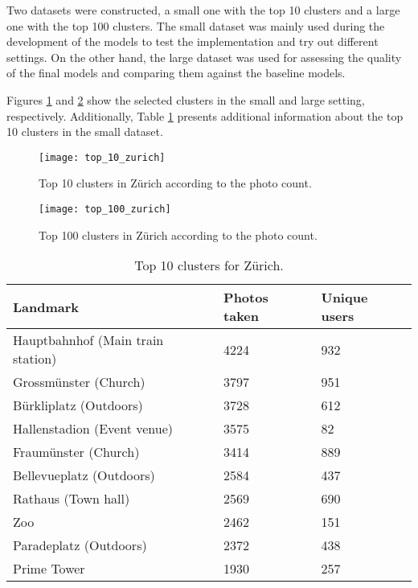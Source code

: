 Two datasets were constructed, a small one with the top 10 clusters and a large one with the top 100 clusters. The small dataset was mainly used during the development of the models to test the implementation and try out different settings. On the other hand, the large dataset was used for assessing the quality of the final models and comparing them against the baseline models.

Figures \ref{fig:top_10_zurich} and \ref{fig:top_100_zurich} show the selected clusters in the small and large setting, respectively. Additionally, Table \ref{tab:top_10_clusters} presents additional information about the top 10 clusters in the small dataset.

\begin{figure}
  \centering
  \texttt{[image: top\_10\_zurich]}
  \caption{Top 10 clusters in Zürich according to the photo count.}
  \label{fig:top_10_zurich}
\end{figure}

\begin{figure}
  \centering
  \texttt{[image: top\_100\_zurich]}
  \caption{Top 100 clusters in Zürich according to the photo count.}
  \label{fig:top_100_zurich}
\end{figure}


\begin{table}
  \centering
  \caption{Top 10 clusters for Zürich.}
  \begin{tabular}{@{}lll@{}}
    \toprule
    Landmark & Photos taken & Unique users  \\
    \midrule
    Hauptbahnhof (Main train station) & 4224 & 932 \\
    Grossmünster (Church) & 3797 & 951 \\
    Bürkliplatz (Outdoors) & 3728 & 612 \\
    Hallenstadion (Event venue) & 3575 & 82 \\
    Fraumünster (Church) & 3414 & 889 \\
    Bellevueplatz (Outdoors) & 2584 & 437 \\
    Rathaus (Town hall) & 2569 & 690 \\
    Zoo & 2462 & 151 \\
    Paradeplatz (Outdoors) & 2372 & 438 \\
    Prime Tower & 1930 & 257 \\
    \bottomrule
  \end{tabular}
  \label{tab:top_10_clusters}
\end{table}

